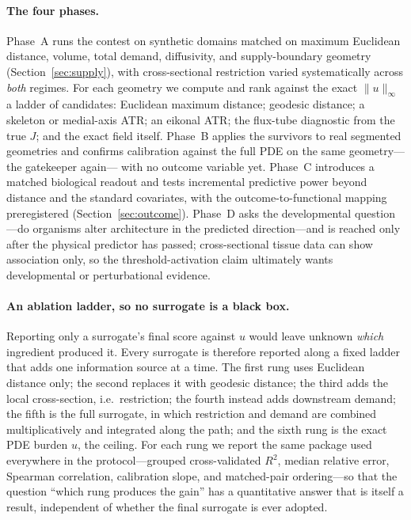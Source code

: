 \documentclass[11pt]{article}
\theoremstyle{remark}
\newcommand{\norminf}[1]{\lVert#1\rVert_{\infty}}
\begin{document}
\paragraph{The four phases.} Phase~A runs the contest on synthetic domains matched
on maximum Euclidean distance, volume, total demand, diffusivity, and
supply-boundary geometry (Section~\ref{sec:supply}), with cross-sectional
restriction varied systematically across \emph{both} regimes. For each geometry we
compute and rank against the exact $\norminf{u}$ a ladder of candidates:
Euclidean maximum distance; geodesic distance; a skeleton or medial-axis ATR; an
eikonal ATR; the flux-tube diagnostic from the true $J$; and the exact field
itself. Phase~B applies the survivors to real segmented geometries and confirms
calibration against the full PDE on the same geometry---the gatekeeper again---
with no outcome variable yet. Phase~C introduces a matched biological readout and
tests incremental predictive power beyond distance and the standard covariates,
with the outcome-to-functional mapping preregistered
(Section~\ref{sec:outcome}). Phase~D asks the developmental question---do
organisms alter architecture in the predicted direction---and is reached only
after the physical predictor has passed; cross-sectional tissue data can show
association only, so the threshold-activation claim ultimately wants
developmental or perturbational evidence.

\paragraph{An ablation ladder, so no surrogate is a black box.} Reporting only a
surrogate's final score against $u$ would leave unknown \emph{which} ingredient
produced it. Every surrogate is therefore reported along a fixed ladder that adds
one information source at a time. The first rung uses Euclidean distance only; the
second replaces it with geodesic distance; the third adds the local cross-section,
i.e.\ restriction; the fourth instead adds downstream demand; the fifth is the
full surrogate, in which restriction and demand are combined multiplicatively and
integrated along the path; and the sixth rung is the exact PDE burden $u$, the
ceiling. For each rung we report the same package used everywhere in the
protocol---grouped cross-validated $R^2$, median relative error, Spearman
correlation, calibration slope, and matched-pair ordering---so that the
question ``which rung produces the gain'' has a quantitative answer that is itself
a result, independent of whether the final surrogate is ever adopted.
\end{document}
